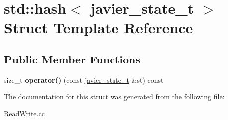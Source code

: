 \hypertarget{structstd_1_1hash_3_01javier__state__t_01_4}{}\section{std\+:\+:hash$<$ javier\+\_\+state\+\_\+t $>$ Struct Template Reference}
\label{structstd_1_1hash_3_01javier__state__t_01_4}
\subsection*{Public Member Functions}
\begin{DoxyCompactItemize}
\item 
\mbox{\label{structstd_1_1hash_3_01javier__state__t_01_4_a34996fa260fcb80704cc4f749120bc67}} 
size\+\_\+t {\bfseries operator()} (const \hyperlink{structjavier__state__t}{javier\+\_\+state\+\_\+t} \&st) const
\end{DoxyCompactItemize}


The documentation for this struct was generated from the following file\+:\begin{DoxyCompactItemize}
\item 
Read\+Write.\+cc\end{DoxyCompactItemize}
